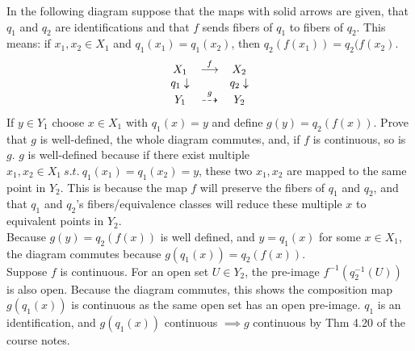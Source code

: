 \documentclass{jhwhw}
\begin{document}
\problem{} %
\noindent
In the following diagram suppose that the maps with solid arrows are given, that $q_1$ and $q_2$ are identifications and that $f$ sends fibers of $q_1$ to fibers of $q_2$.  This means:   if $x_1,x_2\in X_1$ and $q_1(x_1) = q_1(x_2)$, then $q_2(f(x_1)) = q_2(f(x_2)$.
\begin{eqnarray*}
	\begin{array}{ccc}
		X_1 & \buildrel f \over\longrightarrow & X_2 \\
		{q_1}\downarrow &  & {q_2}\downarrow\\
		Y_1 & \buildrel g \over\dashrightarrow & Y_2
	\end{array}
\end{eqnarray*}
If $y\in Y_1$ choose  $x\in X_1$ with $q_1(x) = y$ and define $g(y) = q_2(f(x))$.  Prove that $g$ is well-defined, the whole diagram commutes, and, if $f$ is continuous, so is $g$.
\solution{}
\noindent
$g$ is well-defined because if there exist multiple $x_1, x_2 \in X_1\ s.t.\ q_1(x_1)=q_1(x_2)=y$, these two $x_1, x_2$ are mapped to the same point in $Y_2$. This is because the map $f$ will preserve the fibers of $q_1$ and $q_2$, and that $q_1$ and $q_2$'s fibers/equivalence classes will reduce these multiple $x$ to equivalent points in $Y_2$.
\\

\noindent
Because $g(y) = q_2(f(x))$ is well defined, and $y=q_1(x)$ for some $x\in X_1$, the diagram commutes because $g(q_1(x)) = q_2(f(x))$.
\\

\noindent
Suppose $f$ is continuous. For an open set $U \in Y_2$, the pre-image $f^{-1}(q_2^{-1}(U))$ is also open. Because the diagram commutes, this shows the composition map $g(q_1(x))$ is continuous as the same open set has an open pre-image. $q_1$ is an identification, and $g(q_1(x))$ continuous $\implies g$ continuous by Thm 4.20 of the course notes.
\end{document}
